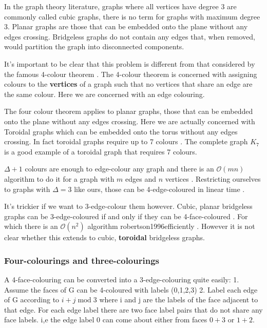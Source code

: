 In the graph theory literature, graphs where all vertices have degree 3 are commonly called cubic graphs, there is no term for graphs with maximum degree 3. Planar graphs are those that can be embedded onto the plane without any edges crossing. Bridgeless graphs do not contain any edges that, when removed, would partition the graph into disconnected components.

It's important to be clear that this problem is different from that considered by the famous 4-colour theorem \textcite{appelEveryPlanarMap1989} . The 4-colour theorem is concerned with assigning colours to the \textbf{vertices} of a graph such that no vertices that share an edge are the same colour. Here we are concerned with an edge colouring.

The four colour theorem applies to planar graphs, those that can be embedded onto the plane without any edges crossing. Here we are actually concerned with Toroidal graphs which can be embedded onto the torus without any edges crossing. In fact toroidal graphs require up to 7 colours \textcite{heawoodMapColouringTheorems} . The complete graph \(K_7\) is a good example of a toroidal graph that requires 7 colours.

\(\Delta + 1\) colours are enough to edge-colour any graph and there is an \(\mathcal{O}(mn)\) algorithm to do it for a graph with \(m\) edges and \(n\) vertices \textcite{gEstimateChromaticClass1964}. Restricting ourselves to graphs with \(\Delta = 3\) like ours, those can be 4-edge-coloured in linear time \textcite{skulrattanakulchai4edgecoloringGraphsMaximum2002} .

It's trickier if we want to 3-edge-colour them however. Cubic, planar bridgeless graphs can be 3-edge-coloured if and only if they can be 4-face-coloured \textcite{tait1880remarks} . For which there is an \(\mathcal{O}(n^2)\) algorithm robertson1996efficiently . However it is not clear whether this extends to cubic, \textbf{toroidal} bridgeless graphs.

\hypertarget{four-colourings-and-three-colourings}{%
\subsubsection{Four-colourings and three-colourings}\label{four-colourings-and-three-colourings}}

A 4-face-colouring can be converted into a 3-edge-colouring quite easily: 1. Assume the faces of G can be 4-coloured with labels (0,1,2,3) 2. Label each edge of G according to \(i + j \;\textrm{mod}\; 3\) where i and j are the labels of the face adjacent to that edge. For each edge label there are two face label pairs that do not share any face labels. i,e the edge label \(0\) can come about either from faces \(0 + 3\) or \(1 + 2\).

